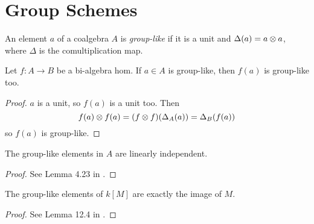\section{Group Schemes}


\begin{definition}
  \label{0-grp-like}
  \uses{}
  \leanok

  An element $a$ of a coalgebra $A$ is \emph{group-like} if it is a unit and $\Delta(a) = a \otimes a$, where $\Delta$ is the comultiplication map.
\end{definition}


\begin{lemma}
  \label{0-grp-like-map}
  \leanok

  Let $f : A \to B$ be a bi-algebra hom. If $a \in A$ is group-like, then $f(a)$ is group-like too.
\end{lemma}
\begin{proof}
  \uses{}
  \leanok

  $a$ is a unit, so $f(a)$ is a unit too. Then
  \[
    f(a) \otimes f(a) = (f \otimes f)(\Delta_A(a)) = \Delta_B(f(a))
  \]
  so $f(a)$ is group-like.
\end{proof}


\begin{lemma}
  \label{0-grp-like-lin-indep}
  \leanok

  The group-like elements in $A$ are linearly independent.
\end{lemma}
\begin{proof}
  \leanok

  See Lemma 4.23 in \cite{Milne_2017}.
\end{proof}


\begin{lemma}
  \label{0-grp-like-grp-alg}
  \leanok

  The group-like elements of $k[M]$ are exactly the image of $M$.
\end{lemma}
\begin{proof}
  \leanok

  See Lemma 12.4 in \cite{Milne_2017}.
\end{proof}


